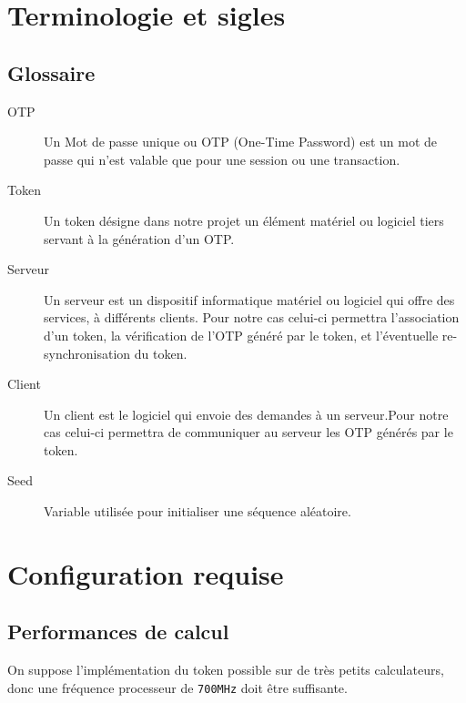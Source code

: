 \documentclass{"../../res/univ-projet"}
\begin{document}
\section{Terminologie et sigles}
\subsection{Glossaire}
\begin{description}
    \item[OTP] Un Mot de passe unique ou OTP (One-Time Password) est un mot de 
    passe qui n'est valable que pour une session ou une transaction.

    \item[Token] Un token désigne dans notre projet un élément matériel ou
    logiciel tiers servant à la génération d'un OTP.

    \item[Serveur] Un serveur est un dispositif informatique matériel ou
    logiciel qui offre des services, à différents clients. Pour notre cas
    celui-ci permettra l'association d'un token, la v\'{e}rification de l'OTP
    g\'{e}n\'{e}r\'{e} par le token, et l'\'{e}ventuelle re-synchronisation du
    token.

    \item[Client] Un client est le logiciel qui envoie des demandes à un
    serveur.Pour notre cas celui-ci permettra de communiquer au serveur les OTP
    g\'{e}n\'{e}r\'{e}s par le token.
    
    \item[Seed] Variable utilis\'ee pour initialiser une s\'equence al\'eatoire.
\end{description}

\section{Configuration requise}
\subsection{Performances de calcul}
On suppose l'implémentation du token possible sur de très petits 
calculateurs, donc une fréquence processeur de \verb?700MHz? doit être suffisante.
\end{document}
